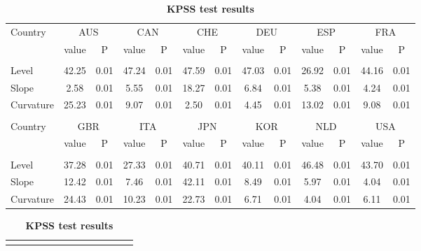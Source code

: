 \documentclass[12pt,bibliography=totoc]{article}
\begin{document}
\begin{appendices}
\begin{table}[H]
\begin{subtable}[t]{1\textwidth}
\begin{tabular}{l cc cc cc cc cc cc}
Country	&	\multicolumn{2}{c}{AUS}			&	\multicolumn{2}{c}{CAN}			&	\multicolumn{2}{c}{CHE}			&	\multicolumn{2}{c}{DEU}			&	\multicolumn{2}{c}{ESP}			&	\multicolumn{2}{c}{FRA}			\\[0.5ex] 

 & value &P & value &P& value &P & value &P& value &P & value &P\\

\hline       \\ [-1.5ex] 

Level	&	42.25 & 0.01 		& 47.24 & 0.01 		& 47.59 & 0.01 		& 47.03 & 0.01 		& 26.92 & 0.01 		& 44.16 & 0.01	\\
Slope	&	2.58 & 0.01 		& 5.55 & 0.01 		& 18.27 & 0.01 		& 6.84 & 0.01 		& 5.38 & 0.01 		& 4.24 & 0.01	\\
Curvature	&25.23 & 0.01 	& 9.07 & 0.01 		& 2.50 & 0.01 		& 4.45 & 0.01 		& 13.02 & 0.01 		& 9.08 & 0.01	\\


\hline   \\ [-1.5ex]    

Country	&	\multicolumn{2}{c}{GBR}			&	\multicolumn{2}{c}{ITA}			&	\multicolumn{2}{c}{JPN}			&	\multicolumn{2}{c}{KOR}			&	\multicolumn{2}{c}{NLD}			&	\multicolumn{2}{c}{USA}			\\

 & value &P & value &P& value &P & value &P& value &P & value &P\\

\hline       \\ [-1.5ex] 

Level	&	37.28 & 0.01 		& 27.33 & 0.01 		& 40.71 & 0.01 		& 40.11 & 0.01 		& 46.48 & 0.01 		& 43.70 & 0.01	\\
Slope	&	12.42 & 0.01 		& 7.46 & 0.01 		& 42.11 & 0.01 		& 8.49 & 0.01 		& 5.97 & 0.01 		& 4.04 & 0.01	\\
Curvature	&24.43 & 0.01 	& 10.23 & 0.01 		& 22.73 & 0.01 		& 6.71 & 0.01 		& 4.04 & 0.01 		& 6.11 & 0.01	\\


\hline
\end{tabular}
\caption{\textbf{KPSS test results}}

\end{subtable}
\hspace{\fill}
\bigskip

\begin{subtable}[t]{1\textwidth}
\centering
\begin{tabular}{l cc cc cc cc cc cc}%
\hline\hline \\ [-1.5ex]                         %


\end{tabular}
\end{subtable}
\end{table}
\end{appendices}
\end{document}
